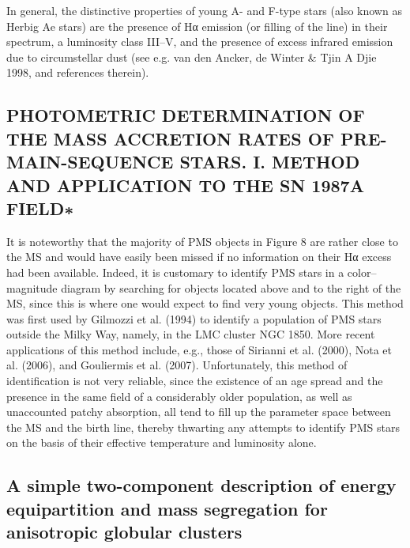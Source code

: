 \documentclass[../main.tex]{subfiles}
\begin{document}
{In general, the distinctive properties of young A- and F-type stars
(also known as Herbig Ae stars) are the presence of Hα emission (or
filling of the line) in their spectrum, a luminosity class III–V, and the
presence of excess infrared emission due to circumstellar dust (see
e.g. van den Ancker, de Winter & Tjin A Djie 1998, and references
therein).

\subsection{PHOTOMETRIC DETERMINATION OF THE MASS ACCRETION RATES OF PRE-MAIN-SEQUENCE STARS. I.
	METHOD AND APPLICATION TO THE SN 1987A FIELD∗}
It is noteworthy that the majority of PMS objects in Figure 8
are rather close to the MS and would have easily been missed if
no information on their Hα excess had been available. Indeed, it
is customary to identify PMS stars in a color–magnitude diagram
by searching for objects located above and to the right of the MS,
since this is where one would expect to find very young objects.
This method was first used by Gilmozzi et al. (1994) to identify
a population of PMS stars outside the Milky Way, namely, in
the LMC cluster NGC 1850. More recent applications of this
method include, e.g., those of Sirianni et al. (2000), Nota et al.
(2006), and Gouliermis et al. (2007).
Unfortunately, this method of identification is not very
reliable, since the existence of an age spread and the presence in the same field of a considerably older population, as well as
unaccounted patchy absorption, all tend to fill up the parameter
space between the MS and the birth line, thereby thwarting any
attempts to identify PMS stars on the basis of their effective
temperature and luminosity alone.

\subsection{A simple two-component description of energy equipartition and
	mass segregation for anisotropic globular clusters}


}
\end{document}
